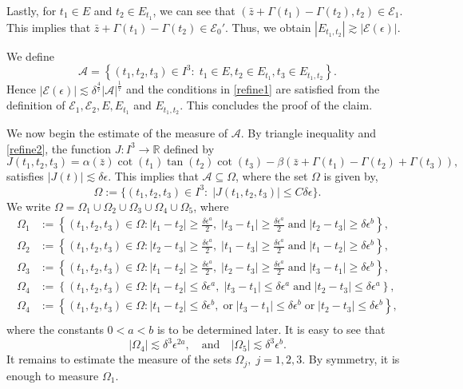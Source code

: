 \documentclass[a4paper,reqno]{amsart}
\theoremstyle{definition}
\theoremstyle{remark}
\numberwithin{equation}{section}
\newcommand{\R}{{\mathbb {R}}}
\begin{document}
	Lastly, for $t_1\in E$ and $t_2\in E_{t_1}$, we can see that $({\bar{z}}+\Gamma(t_1)-\Gamma(t_2),t_2)\in\mathcal{E}_1$. This implies that ${\bar{z}}+\Gamma(t_1)-\Gamma(t_2)\in\mathcal{E}_0'$. Thus, we obtain $|E_{t_1,t_2}|\gtrsim|\mathcal{E}(\epsilon)|$.
	
	We define
	\[\mathcal{A}=\left\{\left(t_1, t_{2}, t_{3}\right)\in I^3:\; t_1\in E, t_{2} \in E_{t_1}, t_{3}\in E_{t_1,t_2}\right\}.\]
	Hence $|\mathcal{E}(\epsilon)|\lesssim\delta^\frac{4}{7}|\mathcal{A}|^\frac{1}{7}$ and the conditions in \eqref{refine1} are satisfied from the definition of $\mathcal{E}_1, \mathcal{E}_2, E, E_{t_1}$ and $E_{t_1,t_2}$. This concludes the proof of the claim.
	
	We now begin the estimate of the measure of $\mathcal{A}$. By triangle inequality and \eqref{refine2}, the function $J:I^3\to\R$ defined by
	\begin{equation*}
		J(t_1,t_2,t_3)=\alpha({\bar z})\cot(t_1)\tan(t_2)\cot(t_3)-\beta({\bar z}+\Gamma(t_1)-\Gamma(t_2)+\Gamma(t_3)),
	\end{equation*}
	satisfies $|J(t)|\lesssim\delta\epsilon$. This implies that $\mathcal{A}\subseteq\Omega$, where the set $\Omega$ is given by,
	\[\Omega:=\{(t_1,t_2,t_3)\in I^3:\;|J(t_1,t_2,t_3)|\leq C\delta\epsilon\}.\]
	We write $\Omega=\Omega_1\cup\Omega_2\cup\Omega_3\cup\Omega_4\cup\Omega_5$, where
	\begin{align*}
		\Omega_1&:=\left\{(t_1,t_2,t_3)\in\Omega:|t_1-t_2|\geq\frac{\delta\epsilon^a}{2},\;|t_3-t_1|\geq\frac{\delta\epsilon^a}{2}\;\text{and}\;|t_2-t_3|\geq\delta\epsilon^b\right\},\\
		\Omega_2&:=\left\{(t_1,t_2,t_3)\in\Omega:|t_2-t_3|\geq\frac{\delta\epsilon^a}{2},\;|t_1-t_3|\geq\frac{\delta\epsilon^a}{2}\;\text{and}\;|t_1-t_2|\geq\delta\epsilon^b\right\},\\
		\Omega_3&:=\left\{(t_1,t_2,t_3)\in\Omega:|t_1-t_2|\geq\frac{\delta\epsilon^a}{2},\;|t_2-t_3|\geq\frac{\delta\epsilon^a}{2}\;\text{and}\;|t_3-t_1|\geq\delta\epsilon^b\right\},\\
		\Omega_4&:=\left\{(t_1,t_2,t_3)\in\Omega:|t_1-t_2|\leq\delta\epsilon^a,\;|t_3-t_1|\leq\delta\epsilon^a\;\text{and}\;|t_2-t_3|\leq\delta\epsilon^a\right\},\\
		\Omega_4&:=\left\{(t_1,t_2,t_3)\in\Omega:|t_1-t_2|\leq\delta\epsilon^b,\;\text{or}\;|t_3-t_1|\leq\delta\epsilon^b\;\text{or}\;|t_2-t_3|\leq\delta\epsilon^b\right\},\\
	\end{align*}
	where the constants $0<a<b$ is to be determined later. It is easy to see that
	\begin{equation}
		|\Omega_4|\lesssim \delta^3\epsilon^{2a},\quad\text{and}\quad |\Omega_5|\lesssim \delta^3\epsilon^b.
	\end{equation}
	It remains to estimate the measure of the sets $\Omega_j,\;j=1,2,3$. By symmetry, it is enough to measure $\Omega_1$.
	
\end{document}
